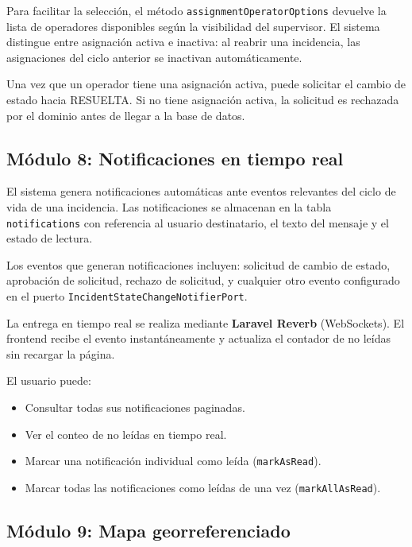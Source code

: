 \documentclass[12pt,a4paper]{article}
\begin{document}
Para facilitar la selección, el método \texttt{assignmentOperatorOptions} devuelve
la lista de operadores disponibles según la visibilidad del supervisor. El sistema
distingue entre asignación activa e inactiva: al reabrir una incidencia, las
asignaciones del ciclo anterior se inactivan automáticamente.

Una vez que un operador tiene una asignación activa, puede solicitar el cambio de
estado hacia RESUELTA. Si no tiene asignación activa, la solicitud es rechazada
por el dominio antes de llegar a la base de datos.

\subsection{Módulo 8: Notificaciones en tiempo real}

El sistema genera notificaciones automáticas ante eventos relevantes del ciclo de
vida de una incidencia. Las notificaciones se almacenan en la tabla
\texttt{notifications} con referencia al usuario destinatario, el texto del mensaje
y el estado de lectura.

Los eventos que generan notificaciones incluyen: solicitud de cambio de estado,
aprobación de solicitud, rechazo de solicitud, y cualquier otro evento configurado
en el puerto \texttt{IncidentStateChangeNotifierPort}.

La entrega en tiempo real se realiza mediante \textbf{Laravel Reverb} (WebSockets).
El frontend recibe el evento instantáneamente y actualiza el contador de no leídas
sin recargar la página.

El usuario puede:
\begin{itemize}
    \item Consultar todas sus notificaciones paginadas.
    \item Ver el conteo de no leídas en tiempo real.
    \item Marcar una notificación individual como leída (\texttt{markAsRead}).
    \item Marcar todas las notificaciones como leídas de una vez
          (\texttt{markAllAsRead}).
\end{itemize}

\subsection{Módulo 9: Mapa georreferenciado}
\end{document}
